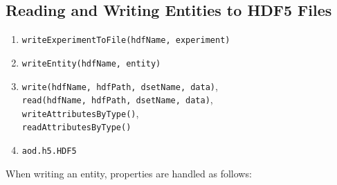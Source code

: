 \documentclass[10pt]{exam}
\newcommand\aodclass[1]{\textcolor{codeblue}{\texttt{#1}}}
\newcommand\aodfcn[1]{\textcolor{darkteal}{\texttt{#1}}}
\begin{document}
	\subsection{Reading and Writing Entities to HDF5 Files}
		\label{subsection:HDFIO}
		\begin{enumerate}
			\item \aodfcn{writeExperimentToFile(hdfName, experiment)}
			\item \aodfcn{writeEntity(hdfName, entity)}
			\item \aodfcn{write(hdfName, hdfPath, dsetName, data)},\\ \aodfcn{read(hdfName, hdfPath, dsetName, data)},\\ 
			\aodfcn{writeAttributesByType()},\\ \aodfcn{readAttributesByType()}
			\item \aodclass{aod.h5.HDF5}
		\end{enumerate}
		\noindent When writing an entity, properties are handled as follows:
\end{document}
